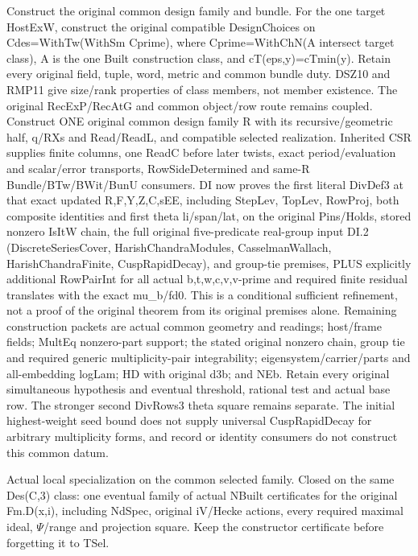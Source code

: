 \begin{description}[style=nextline]
\item[28. DESIGN\_CHOICES\_COMMON --- C] Construct the original common design family and bundle. For the one target HostExW, construct the original compatible DesignChoices on Cdes=WithTw(WithSm Cprime), where Cprime=WithChN(A intersect target class), A is the one Built construction class, and cT(eps,y)=cTmin(y). Retain every original field, tuple, word, metric and common bundle duty. DSZ10 and RMP11 give size/\allowbreak{}rank properties of class members, not member existence. The original RecExP/\allowbreak{}RecAtG and common object/\allowbreak{}row route remains coupled. Construct ONE original common design family R with its recursive/\allowbreak{}geometric half, q/\allowbreak{}RXs and Read/\allowbreak{}ReadL, and compatible selected realization. Inherited CSR supplies finite columns, one ReadC before later twists, exact period/\allowbreak{}evaluation and scalar/\allowbreak{}error transports, RowSideDetermined and same-R Bundle/\allowbreak{}BTw/\allowbreak{}BWit/\allowbreak{}BunU consumers. DI now proves the first literal DivDef3 at that exact updated R,F,Y,Z,C,sEE, including StepLev, TopLev, RowProj, both composite identities and first theta li/\allowbreak{}span/\allowbreak{}lat, on the original Pins/\allowbreak{}Holds, stored nonzero IsItW chain, the full original five-predicate real-group input DI.2 (DiscreteSeriesCover, HarishChandraModules, CasselmanWallach, HarishChandraFinite, CuspRapidDecay), and group-tie premises, PLUS explicitly additional RowPairInt for all actual b,t,w,c,v,v-prime and required finite residual translates with the exact mu\_b/\allowbreak{}fd0. This is a conditional sufficient refinement, not a proof of the original theorem from its original premises alone. Remaining construction packets are actual common geometry and readings; host/\allowbreak{}frame fields; MultEq nonzero-part support; the stated original nonzero chain, group tie and required generic multiplicity-pair integrability; eigensystem/\allowbreak{}carrier/\allowbreak{}parts and all-embedding logLam; HD with original d3b; and NEb. Retain every original simultaneous hypothesis and eventual threshold, rational test and actual base row. The stronger second DivRows3 theta square remains separate. The initial highest-weight seed bound does not supply universal CuspRapidDecay for arbitrary multiplicity forms, and record or identity consumers do not construct this common datum.

\item[29. LOCAL\_NBUILT\_COMMON --- C] Actual local specialization on the common selected family. Closed on the same Des(C,3) class: one eventual family of actual NBuilt certificates for the original Fm.D(x,i), including NdSpec, original iV/\allowbreak{}Hecke actions, every required maximal ideal, $\Psi$/\allowbreak{}range and projection square. Keep the constructor certificate before forgetting it to TSel.


\end{description}
